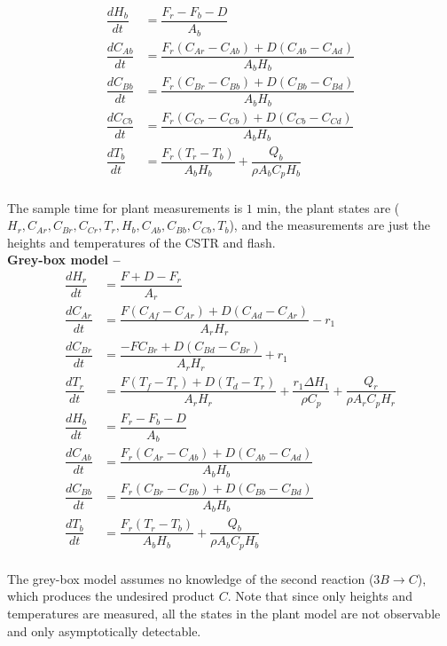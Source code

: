 \documentclass{article}
\begin{document}
\begin{align*}
  \dfrac{dH_b}{dt} &= \dfrac{F_r - F_b - D}{A_b} \\
  \dfrac{dC_{Ab}}{dt} &= \dfrac{F_r(C_{Ar} -C_{Ab}) + 
                          D(C_{Ab} -C_{Ad})}{A_bH_b} \\
  \dfrac{dC_{Bb}}{dt} &= \dfrac{F_r(C_{Br} -C_{Bb}) + 
                          D(C_{Bb} -C_{Bd})}{A_bH_b} \\
  \dfrac{dC_{Cb}}{dt} &= \dfrac{F_r(C_{Cr} -C_{Cb}) + 
                          D(C_{Cb} -C_{Cd})}{A_bH_b} \\
  \dfrac{dT_b}{dt} &= \dfrac{F_r(T_r - T_b)}{A_bH_b} +
                      \dfrac{Q_b}{\rho A_b C_p H_b}\\
\end{align*}

The sample time for plant measurements is $1$ min, the 
plant states are ($H_r, C_{Ar}, C_{Br}, C_{Cr}, T_r, 
H_b, C_{Ab}, C_{Bb}, C_{Cb}, T_b$), and the measurements are just 
the heights and temperatures of the CSTR and flash. \\

\textbf{Grey-box model -- }
\begin{align*}
  \dfrac{dH_r}{dt} &= \dfrac{F + D -F_r}{A_r}\\
  \dfrac{dC_{Ar}}{dt} &= \dfrac{F(C_{Af} -C_{Ar}) + 
                         D(C_{Ad} -C_{Ar})}{A_rH_r} - r_1 \\
  \dfrac{dC_{Br}}{dt} &= \dfrac{-FC_{Br} + 
                          D(C_{Bd} -C_{Br})}{A_rH_r} + r_1\\
  \dfrac{dT_r}{dt} &= \dfrac{F(T_f - T_r) + D(T_d -T_r)}{A_rH_r} + 
                      \dfrac{r_1\Delta H_1}{\rho C_p} + 
                      \dfrac{Q_r}{\rho A_r C_p H_r}\\
  \dfrac{dH_b}{dt} &= \dfrac{F_r - F_b - D}{A_b} \\
  \dfrac{dC_{Ab}}{dt} &= \dfrac{F_r(C_{Ar} -C_{Ab}) + 
                          D(C_{Ab} -C_{Ad})}{A_bH_b} \\
  \dfrac{dC_{Bb}}{dt} &= \dfrac{F_r(C_{Br} -C_{Bb}) + 
                          D(C_{Bb} -C_{Bd})}{A_bH_b} \\
  \dfrac{dT_b}{dt} &= \dfrac{F_r(T_r - T_b)}{A_bH_b} +
                      \dfrac{Q_b}{\rho A_b C_p H_b}\\
\end{align*}

The grey-box model assumes no knowledge of the second 
reaction ($3B \rightarrow C$), which produces the undesired 
product $C$. Note that since only heights and temperatures are 
measured, all the states in the plant model are 
not observable and only asymptotically detectable. 
\end{document}
